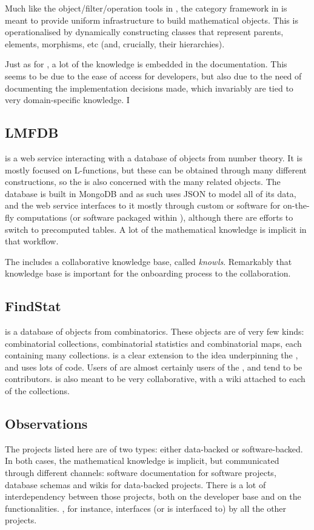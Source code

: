 Much like the object/filter/operation tools in \GAP, the category framework in \SageMath is meant to provide uniform infrastructure to build mathematical objects. This is operationalised by dynamically constructing classes that represent parents, elements, morphisms, etc (and, crucially, their hierarchies). 

Just as for \GAP, a lot of the knowledge is embedded in the documentation. This seems to be due to the ease of access for developers, but also due to the need of documenting the implementation decisions made, which invariably are tied to very domain-specific knowledge. 
I
\subsection{LMFDB}
\LMFDB \cite{lmfdb} is a  web service interacting with a database of objects from number theory. It is mostly focused on 
L-functions, but these can be obtained through many different constructions, so the \LMFDB is also concerned with the many related objects. The database is built in MongoDB and as such uses JSON to model all of its data, and the web service interfaces to it mostly through custom \python or \SageMath software for on-the-fly computations (or software packaged within \SageMath), although there are efforts to switch to precomputed tables. A lot of the mathematical knowledge is implicit in that workflow. 

The \LMFDB includes a collaborative knowledge base, called \emph{knowls}. Remarkably that knowledge base is important for the onboarding process to the collaboration. 

\subsection{FindStat}
\FindStat \cite{findstat} is a database of objects from combinatorics. These objects are of very few kinds: combinatorial collections, combinatorial statistics and combinatorial maps, each containing many collections. \FindStat is a clear extension to the idea underpinning the \OEIS, and uses lots of \SageMath code. Users of \FindStat are almost certainly users of the \OEIS, and tend to be \SageMath contributors. \FindStat is also meant to be very collaborative, with a wiki attached to each of the collections.

\subsection{Observations}

The projects listed here are of two types: either data-backed or software-backed. In both cases, the mathematical knowledge is implicit, but communicated through different channels: software documentation for software projects, database schemas and wikis for data-backed projects. There is a lot of interdependency between those projects, both on the developer base and on the functionalities. \SageMath, for instance, interfaces (or is interfaced to) by all the other projects. 

